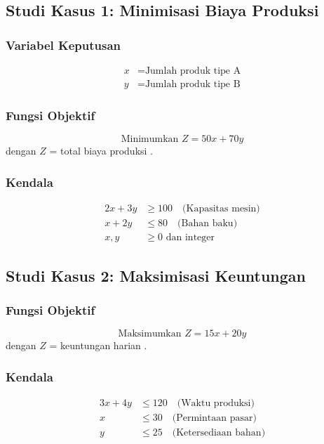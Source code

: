 \documentclass[conference]{IEEEtran}
\begin{document}
\subsection{Studi Kasus 1: Minimisasi Biaya Produksi}
\subsubsection{Variabel Keputusan}
\begin{align*}
x &= \text{Jumlah produk tipe A} \\
y &= \text{Jumlah produk tipe B}
\end{align*}

\subsubsection{Fungsi Objektif}
\begin{equation}
\text{Minimumkan } Z = 50x + 70y
\end{equation}
dengan \(Z\) = total biaya produksi \cite{1}.

\subsubsection{Kendala}
\begin{align}
2x + 3y &\geq 100 \quad \text{(Kapasitas mesin)} \\
x + 2y &\leq 80 \quad \text{(Bahan baku)} \\
x, y &\geq 0 \text{ dan integer}
\end{align}

\subsection{Studi Kasus 2: Maksimisasi Keuntungan}
\subsubsection{Fungsi Objektif}
\begin{equation}
\text{Maksimumkan } Z = 15x + 20y
\end{equation}
dengan \(Z\) = keuntungan harian \cite{10}.

\subsubsection{Kendala}
\begin{align}
3x + 4y &\leq 120 \quad \text{(Waktu produksi)} \\
x &\leq 30 \quad \text{(Permintaan pasar)} \\
y &\leq 25 \quad \text{(Ketersediaan bahan)}
\end{align}
\end{document}
